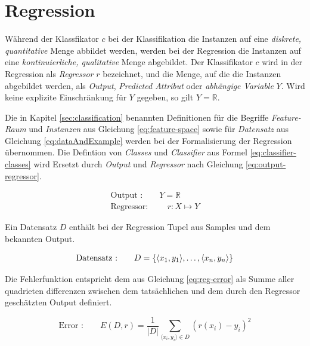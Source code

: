 \section{Regression}

Während der Klassfikator $c$ bei der Klassifikation die Instanzen auf eine \emph{diskrete, quantitative} Menge abbildet werden, werden bei der Regression die Instanzen auf eine \emph{kontinuierliche, qualitative} Menge abgebildet. Der Klassifikator $c$ wird in der Regression als \emph{Regressor} $r$ bezeichnet, und die Menge, auf die die Instanzen abgebildet werden, als \emph{Output}, \emph{Predicted Attribut} oder \emph{abhängige Variable} $Y$. Wird keine explizite Einschränkung für $Y$ gegeben, so gilt $Y = \mathbb{R}$. \cite[S. 24]{learning_cart_dobra} \cite[S. 8]{machine_marsland} \cite[S. 28]{statistical_learning}

Die in Kapitel \ref{sec:classification} benannten Definitionen für die Begriffe \emph{Feature-Raum} und \emph{Instanzen} aus Gleichung \ref{eq:feature-space} sowie für \emph{Datensatz} aus Gleichung \ref{eq:dataAndExample} werden bei der Formalisierung der Regression übernommen. Die Defintion von \emph{Classes} und \emph{Classifier} aus Formel \ref{eq:classifier-classes} wird Ersetzt durch \emph{Output} und \emph{Regressor} nach Gleichung \ref{eq:output-regressor}.\cite[S. 24]{learning_cart_dobra}

\begin{equation}
\label{eq:output-regressor}
\begin{gathered}
\text{Output :} \qquad Y = \mathbb{R}\\
\text{Regressor: } \qquad  r: X \mapsto Y
\end{gathered}
\end{equation}

Ein Datensatz $D$ enthält bei der Regression Tupel aus Samples und dem bekannten Output.

\begin{equation}
\text{Datensatz :} \qquad D = \{ \langle x_1, y_1 \rangle, \ldots , \langle x_n, y_n \rangle  \} \\
\end{equation}

Die Fehlerfunktion entspricht dem aus Gleichung \ref{eq:reg-error} als Summe aller quadrieten differenzen zwischen dem tatsächlichen und dem durch den Regressor geschätzten Output definiert.\cite[S. 29]{statistical_learning} \cite[S. 25]{learning_cart_dobra}

\begin{equation}
\label{eq:reg-error}
\text{Error :} \qquad E(D,r) = \frac{1}{|D|} \sum_{ \langle x_i, y_i \rangle \in D} ( r(x_i) - y_i )^2
\end{equation}

